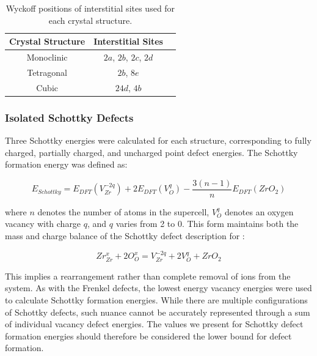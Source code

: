 \begin{table}[htp] %
\onehalfspacing
\centering
\caption{Wyckoff positions of interstitial sites used for each crystal structure.}
\label{table:interstitials}
\begin{tabular}{lcc}
\hline
\hspace{0.7 cm} {\bf Crystal Structure} \hspace{0.7 cm}                              & \hspace{0.7 cm} {\bf Interstitial Sites} \hspace{0.7 cm}                                               \\ \hline
\multicolumn{1}{c}{Monoclinic}              & $2a$, $2b$, $2c$, $2d$ \\
\multicolumn{1}{c}{Tetragonal}            & $2b$, $8e$                                   \\
\multicolumn{1}{c}{Cubic}       & $24d$, $4b$                                          \\ \hline
\end{tabular}
\end{table}

\subsubsection*{Isolated Schottky Defects}

Three Schottky energies were calculated for each structure, corresponding to fully charged, partially charged, and uncharged point defect energies. The Schottky formation energy was defined as:

\begin{equation}
\label{equation_schottky}
E_{Schottky} = E_{DFT}(V^{-2q}_{Zr}) + 2E_{DFT}(V^{q}_{O}) -\frac{3(n-1)}{n}E_{DFT}(ZrO_2)%
\end{equation}

where $n$ denotes the number of atoms in the supercell, $V^{q}_{O}$ denotes an oxygen vacancy with charge $q$, and $q$ varies from 2 to 0. This form maintains both the mass and charge balance of the Schottky defect description for \zirconia :

\begin{equation}
\label{generic_schottky}
Zr^{x}_{Zr} + 2O^{x}_{O} = V^{-2q}_{Zr} + 2V^{q}_{O} + ZrO_{2}
\end{equation}

This implies a rearrangement rather than complete removal of ions from the system. As with the Frenkel defects, the lowest energy vacancy energies were used to calculate Schottky formation energies. While there are multiple configurations of Schottky defects, such nuance cannot be accurately represented through a sum of individual vacancy defect energies. The values we present for Schottky defect formation energies should therefore be considered the lower bound for defect formation. 

